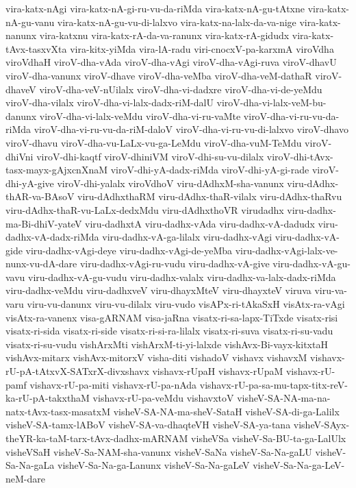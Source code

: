 {vira-katx-nAgi
vira-katx-nA-gi-ru-vu-da-riMda
vira-katx-nA-gu-tAtxne
vira-katx-nA-gu-vanu
vira-katx-nA-gu-vu-di-lalxvo
vira-katx-na-lalx-da-va-nige
vira-katx-nanunx
vira-katxnu
vira-katx-rA-da-va-ranunx
vira-katx-rA-gidudx
vira-katx-tAvx-tasxvXta
vira-kitx-yiMda
vira-lA-radu
viri-cnocxV-pa-karxmA
viroVdha
viroVdhaH
viroV-dha-vAda
viroV-dha-vAgi
viroV-dha-vAgi-ruva
viroV-dhavU
viroV-dha-vanunx
viroV-dhave
viroV-dha-veMba
viroV-dha-veM-dathaR
viroV-dhaveV
viroV-dha-veV-nUilalx
viroV-dha-vi-dadxre
viroV-dha-vi-de-yeMdu
viroV-dha-vilalx
viroV-dha-vi-lalx-dadx-riM-dalU
viroV-dha-vi-lalx-veM-bu-danunx
viroV-dha-vi-lalx-veMdu
viroV-dha-vi-ru-vaMte
viroV-dha-vi-ru-vu-da-riMda
viroV-dha-vi-ru-vu-da-riM-daloV
viroV-dha-vi-ru-vu-di-lalxvo
viroV-dhavo
viroV-dhavu
viroV-dha-vu-LaLx-vu-ga-LeMdu
viroV-dha-vuM-TeMdu
viroV-dhiVni
viroV-dhi-kaqtf
viroV-dhiniVM
viroV-dhi-su-vu-dilalx
viroV-dhi-tAvx-tasx-mayx-gAjxcnXnaM
viroV-dhi-yA-dadx-riMda
viroV-dhi-yA-gi-rade
viroV-dhi-yA-give
viroV-dhi-yalalx
viroVdhoV
viru-dAdhxM-sha-vanunx
viru-dAdhx-thAR-va-BAsoV
viru-dAdhxthaRM
viru-dAdhx-thaR-vilalx
viru-dAdhx-thaRvu
viru-dAdhx-thaR-vu-LaLx-dedxMdu
viru-dAdhxthoVR
virudadhx
viru-dadhx-ma-Bi-dhiV-yateV
viru-dadhxtA
viru-dadhx-vAda
viru-dadhx-vA-dadudx
viru-dadhx-vA-dadx-riMda
viru-dadhx-vA-ga-lilalx
viru-dadhx-vAgi
viru-dadhx-vA-gide
viru-dadhx-vAgi-deye
viru-dadhx-vAgi-de-yeMba
viru-dadhx-vAgi-lalx-ve-nunx-vu-dA-dare
viru-dadhx-vAgi-ru-vudu
viru-dadhx-vA-give
viru-dadhx-vA-gu-vavu
viru-dadhx-vA-gu-vudu
viru-dadhx-valalx
viru-dadhx-va-lalx-dadx-riMda
viru-dadhx-veMdu
viru-dadhxveV
viru-dhayxMteV
viru-dhayxteV
viruva
viru-va-varu
viru-vu-danunx
viru-vu-dilalx
viru-vudo
visAPx-ri-tAkaSxH
visAtx-ra-vAgi
visAtx-ra-vanenx
visa-gARNAM
visa-jaRna
visatx-ri-sa-lapx-TiTxde
visatx-risi
visatx-ri-sida
visatx-ri-side
visatx-ri-si-ra-lilalx
visatx-ri-suva
visatx-ri-su-vadu
visatx-ri-su-vudu
vishArxMti
vishArxM-ti-yi-lalxde
vishAvx-Bi-vayx-kitxtaH
vishAvx-mitarx
vishAvx-mitorxV
visha-diti
vishadoV
vishavx
vishavxM
vishavx-rU-pA-tAtxvX-SATxrX-divxshavx
vishavx-rUpaH
vishavx-rUpaM
vishavx-rU-pamf
vishavx-rU-pa-miti
vishavx-rU-pa-nAda
vishavx-rU-pa-sa-mu-tapx-titx-reV-ka-rU-pA-takxthaM
vishavx-rU-pa-veMdu
vishavxtoV
visheV-SA-NA-ma-na-natx-tAvx-tasx-masatxM
visheV-SA-NA-ma-sheV-SataH
visheV-SA-di-ga-Lalilx
visheV-SA-tamx-lABoV
visheV-SA-va-dhaqteVH
visheV-SA-ya-tana
visheV-SAyx-theYR-ka-taM-tarx-tAvx-dadhx-mARNAM
visheVSa
visheV-Sa-BU-ta-ga-LalUlx
visheVSaH
visheV-Sa-NAM-sha-vanunx
visheV-SaNa
visheV-Sa-Na-gaLU
visheV-Sa-Na-gaLa
visheV-Sa-Na-ga-Lanunx
visheV-Sa-Na-gaLeV
visheV-Sa-Na-ga-LeV-neM-dare
}
